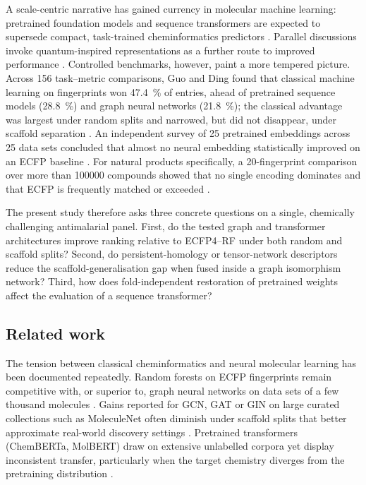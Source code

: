 \documentclass[11pt,a4paper]{article}
\begin{document}
A scale-centric narrative has gained currency in molecular machine learning: pretrained foundation models and sequence transformers are expected to supersede compact, task-trained cheminformatics predictors \citep{mol_tdl_2026,tn_efficient_2026}. Parallel discussions invoke quantum-inspired representations as a further route to improved performance \citep{naleczcharkiewicz2024,kumar2024quantumdrug}. Controlled benchmarks, however, paint a more tempered picture. Across \num{156} task--metric comparisons, Guo and Ding found that classical machine learning on fingerprints won \qty{47.4}{\percent} of entries, ahead of pretrained sequence models (\qty{28.8}{\percent}) and graph neural networks (\qty{21.8}{\percent}); the classical advantage was largest under random splits and narrowed, but did not disappear, under scaffold separation \citep{guo_ding_2026}. An independent survey of \num{25} pretrained embeddings across \num{25} data sets concluded that almost no neural embedding statistically improved on an ECFP baseline \citep{benchmark_pretrained_2025}. For natural products specifically, a \num{20}-fingerprint comparison over more than \num{100000} compounds showed that no single encoding dominates and that ECFP is frequently matched or exceeded \citep{boldini2024}.

The present study therefore asks three concrete questions on a single, chemically challenging antimalarial panel. First, do the tested graph and transformer architectures improve ranking relative to ECFP4--RF under both random and scaffold splits? Second, do persistent-homology or tensor-network descriptors reduce the scaffold-generalisation gap when fused inside a graph isomorphism network? Third, how does fold-independent restoration of pretrained weights affect the evaluation of a sequence transformer?

\subsection{Related work}

The tension between classical cheminformatics and neural molecular learning has been documented repeatedly. Random forests on ECFP fingerprints remain competitive with, or superior to, graph neural networks on data sets of a few thousand molecules \citep{guo_ding_2026,benchmark_pretrained_2025}. Gains reported for GCN, GAT or GIN on large curated collections such as MoleculeNet often diminish under scaffold splits that better approximate real-world discovery settings \citep{wu_molnet_2018,guo_ding_2026}. Pretrained transformers (ChemBERTa, MolBERT) draw on extensive unlabelled corpora yet display inconsistent transfer, particularly when the target chemistry diverges from the pretraining distribution \citep{chemberta_2020,benchmark_pretrained_2025}.
\end{document}
